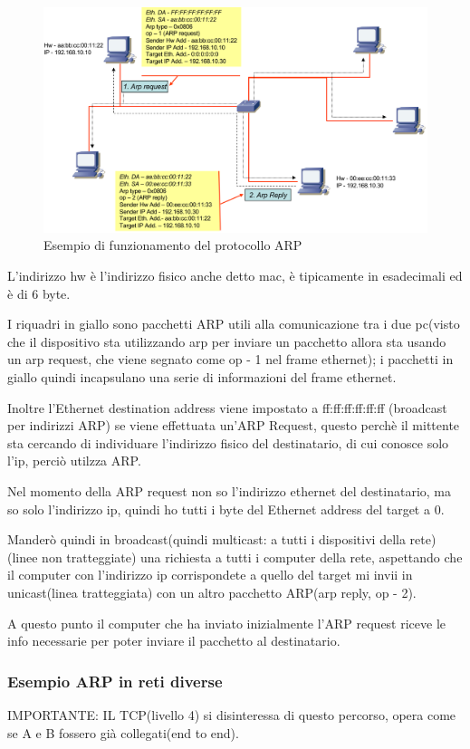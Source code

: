 \begin{figure}[h!]
    \centering
    \includegraphics[width=1\textwidth]{images/esempioarp.png}
    \caption{Esempio di funzionamento del protocollo ARP}
    \label{fig:esempioARP}
\end{figure}

L'indirizzo hw è l'indirizzo fisico anche detto mac, è tipicamente in esadecimali ed è di 6 byte.

I riquadri in giallo sono pacchetti ARP utili alla comunicazione tra i due pc(visto che il dispositivo sta utilizzando arp per inviare un pacchetto allora sta usando un arp request, che viene segnato come op - 1 nel frame ethernet); i pacchetti in giallo quindi incapsulano una serie di informazioni del frame ethernet. 

Inoltre l'Ethernet destination address viene impostato a ff:ff:ff:ff:ff:ff (broadcast per indirizzi ARP) se viene effettuata un'ARP Request, questo perchè il mittente sta cercando di individuare l'indirizzo fisico del destinatario, di cui conosce solo l'ip, perciò utilzza ARP.

Nel momento della ARP request non so l'indirizzo ethernet del destinatario, ma so solo l'indirizzo ip, quindi ho tutti i byte del Ethernet address del target a 0.

Manderò quindi in broadcast(quindi multicast: a tutti i dispositivi della rete)(linee non tratteggiate) una richiesta a tutti i computer della rete, aspettando che il computer con l'indirizzo ip corrispondete a quello del target mi invii in unicast(linea tratteggiata) con un altro pacchetto ARP(arp reply, op - 2).

A questo punto il computer che ha inviato inizialmente l'ARP request riceve le info necessarie per poter inviare il pacchetto al destinatario. 
\newpage
\subsubsection{Esempio ARP in reti diverse}
IMPORTANTE: IL TCP(livello 4) si disinteressa di questo percorso, opera come se A e B fossero già collegati(end to end).

